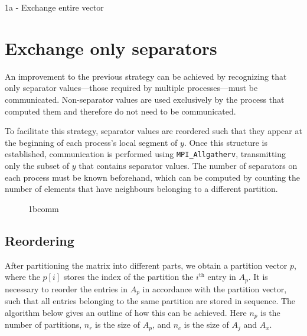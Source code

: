 \begin{algorithm}[H]
    \caption{1a - Exchange entire vector}
    \SetAlgoVlined


\end{algorithm}

\section{Exchange only separators}

An improvement to the previous strategy can be achieved by recognizing that only separator values—those required by multiple processes—must be communicated. Non-separator values are used exclusively by the process that computed them and therefore do not need to be communicated.

To facilitate this strategy, separator values are reordered such that they appear at the beginning of each process's local segment of \(y\). Once this structure is established, communication is performed using \texttt{MPI\_Allgatherv}, transmitting only the subset of \(y\) that contains separator values. The number of separators on each process must be known beforehand, which can be computed by counting the number of elements that have neighbours belonging to a different partition.

\begin{figure}[ht]
    \centering
    \caption{1bcomm}
    \label{fig:1bcomm}
\end{figure}


\subsection{Reordering}
After partitioning the matrix into different parts, we obtain a partition vector \(p\), where the \(p[i]\) stores the index of the partition the \(i^{\text{th}}\) entry in \(A_{p}\). It is necessary to reorder the entries in \(A_{p}\) in accordance with the partition vector, such that all entries belonging to the same partition are stored in sequence. The algorithm below gives an outline of how this can be achieved. Here \(n_{p}\) is the number of partitions, \(n_{r}\) is the size of \(A_{p}\), and \(n_{c}\) is the size of \(A_{j}\) and \(A_{x}\).

